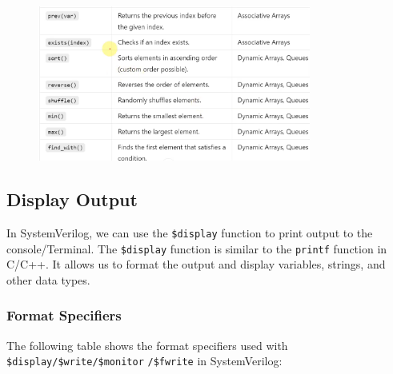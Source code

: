 \documentclass[12pt, a4paper]{article}
\begin{document}
\vspace{-2em}
\begin{figure}[H]
    \centering
    \includegraphics[width=0.8\textwidth]{DataTypes_sum4.png}
\end{figure}

\subsection{Display Output}

In SystemVerilog, we can use the \texttt{\$display} function to print output to the console/Terminal. The \texttt{\$display} function is similar to the \texttt{printf} function in C/C++. It allows us to format the output and display variables, strings, and other data types.

\subsubsection{Format Specifiers}

The following table shows the format specifiers used with \texttt{\$display/\$write/\$monitor}  \texttt{/\$fwrite} in SystemVerilog:

\vspace{-1em}
\end{document}
